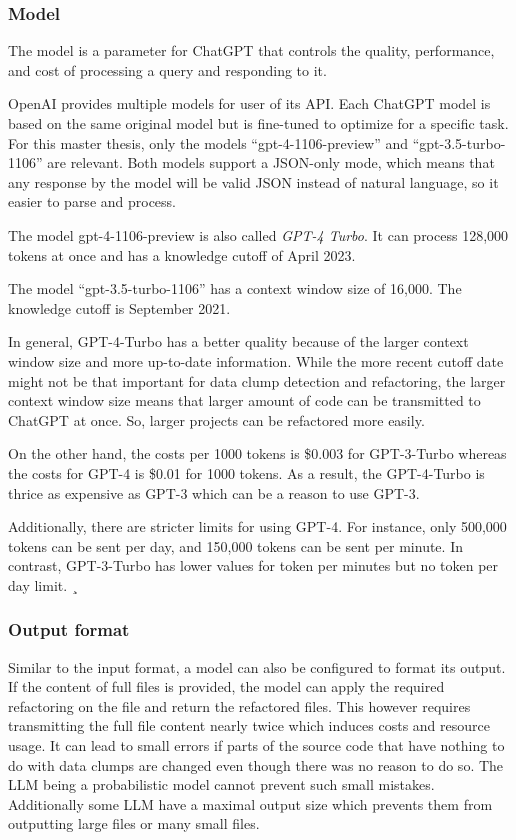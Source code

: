 \subsubsection{Model}
The model is a parameter for ChatGPT that controls the quality, performance, and cost of processing a query and responding to it. 

OpenAI provides multiple models for user of its API. Each  ChatGPT model  is based on the same original model but is fine-tuned to optimize for a specific task. For this master thesis, only  the  models \enquote{gpt-4-1106-preview} and \enquote{gpt-3.5-turbo-1106} are relevant. Both models support a \ac{JSON}-only mode, which means that any response by the model will be valid \ac{JSON} instead of natural language, so it easier to parse and process. \cite{chatgpt_new_models}

The model {gpt-4-1106-preview} is also called \textit{GPT-4 Turbo}. It can process 128,000 tokens at once and has a knowledge cutoff of April 2023. \cite{chatgpt_new_models}

The model \enquote{gpt-3.5-turbo-1106} has a context window size of 16,000. The knowledge cutoff is September 2021. \cite{chatgpt_new_models}


In general, GPT-4-Turbo has a better quality because of the larger context window size and more up-to-date information. While the more recent cutoff date might not be that important for data clump detection and refactoring, the larger context window size means that larger amount of code can be transmitted to ChatGPT at once. So, larger projects can be refactored more easily.  \cite{chatgpt_new_models}

On the other hand, the costs per 1000 tokens is  \$0.003 for GPT-3-Turbo whereas the costs for GPT-4 is \$0.01 for 1000 tokens. As a result, the GPT-4-Turbo is thrice as expensive as GPT-3 which can be a reason to use GPT-3. \cite{chatgpt_new_models}

Additionally, there are  stricter limits for using GPT-4. For instance, only 500,000 tokens can be sent per day, and 150,000 tokens can be sent per minute. In contrast, GPT-3-Turbo has  lower values for token per minutes but no  token per day limit.  ¸\cite{chatgpt_limits}

\subsubsection{Output format}
 Similar to the input format, a model can also be configured to format its output. If the content of full files is provided, the model can  apply the required refactoring on the file and return the refactored files. This however requires transmitting the full file content nearly twice which induces costs and resource usage. It can lead to small errors if parts of the source code that have nothing to do with data clumps are changed even though there was no reason to do so. The \ac{LLM} being a probabilistic model cannot prevent such small mistakes. Additionally some \acs{LLM} have a maximal output size which prevents them from outputting large files or many small files.

